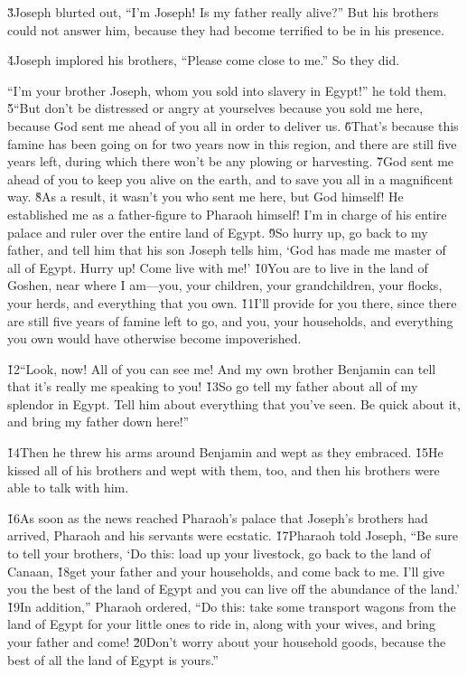 \v{3}Joseph blurted out, ``I'm Joseph! Is my father really alive?'' But his brothers could not answer him, because they had become terrified to be in his presence.

\v{4}Joseph implored his brothers, ``Please come close to me.'' So they did.

``I'm your brother Joseph, whom you sold into slavery in Egypt!'' he told them. \v{5}``But don't be distressed or angry at yourselves because you sold me here, because God sent me ahead of you all in order to deliver us. \v{6}That's because this famine has been going on for two years now in this region, and there are still five years left, during which there won't be any plowing or harvesting. \v{7}God sent me ahead of you to keep you alive on the earth, and to save you all in a magnificent way. \v{8}As a result, it wasn't you who sent me here, but God himself! He established me as a father-figure to Pharaoh himself! I'm in charge of his entire palace and ruler over the entire land of Egypt. \v{9}So hurry up, go back to my father, and tell him that his son Joseph tells him, `God has made me master of all of Egypt. Hurry up! Come live with me!' \v{10}You are to live in the land of Goshen, near where I am---you, your children, your grandchildren, your flocks, your herds, and everything that you own. \v{11}I'll provide for you there, since there are still five years of famine left to go, and you, your households, and everything you own would have otherwise become impoverished.

\v{12}``Look, now! All of you can see me! And my own brother Benjamin can tell that it's really me speaking to you! \v{13}So go tell my father about all of my splendor in Egypt. Tell him about everything that you've seen. Be quick about it, and bring my father down here!''

\v{14}Then he threw his arms around Benjamin and wept as they embraced. \v{15}He kissed all of his brothers and wept with them, too, and then his brothers were able to talk with him.

\v{16}As soon as the news reached Pharaoh's palace that Joseph's brothers had arrived, Pharaoh and his servants were ecstatic. \v{17}Pharaoh told Joseph, ``Be sure to tell your brothers, `Do this: load up your livestock, go back to the land of Canaan, \v{18}get your father and your households, and come back to me. I'll give you the best of the land of Egypt and you can live off the abundance of the land.' \v{19}In addition,'' Pharaoh ordered, ``Do this: take some transport wagons from the land of Egypt for your little ones to ride in, along with your wives, and bring your father and come! \v{20}Don't worry about your household goods, because the best of all the land of Egypt is yours.''

